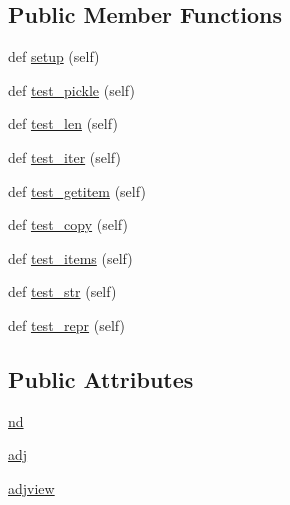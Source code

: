 \subsection*{Public Member Functions}
\begin{DoxyCompactItemize}
\item 
def \hyperlink{classnetworkx_1_1classes_1_1tests_1_1test__coreviews_1_1TestAdjacencyView_ae29722ea74e1008230f548b5bf24a44d}{setup} (self)
\item 
def \hyperlink{classnetworkx_1_1classes_1_1tests_1_1test__coreviews_1_1TestAdjacencyView_acab6e91d2293e722e977cbc924e458e5}{test\+\_\+pickle} (self)
\item 
def \hyperlink{classnetworkx_1_1classes_1_1tests_1_1test__coreviews_1_1TestAdjacencyView_aafd565b4633c66e4b2fdf0b8571331f4}{test\+\_\+len} (self)
\item 
def \hyperlink{classnetworkx_1_1classes_1_1tests_1_1test__coreviews_1_1TestAdjacencyView_ac63721f7414e8827a32aa8a0fc998ede}{test\+\_\+iter} (self)
\item 
def \hyperlink{classnetworkx_1_1classes_1_1tests_1_1test__coreviews_1_1TestAdjacencyView_a8bc801e9aa5de9006c0c087b6c1a2737}{test\+\_\+getitem} (self)
\item 
def \hyperlink{classnetworkx_1_1classes_1_1tests_1_1test__coreviews_1_1TestAdjacencyView_a94d86c7498b436c00389946b1b67132a}{test\+\_\+copy} (self)
\item 
def \hyperlink{classnetworkx_1_1classes_1_1tests_1_1test__coreviews_1_1TestAdjacencyView_a33a0c28ef69d9b523540c3df62816241}{test\+\_\+items} (self)
\item 
def \hyperlink{classnetworkx_1_1classes_1_1tests_1_1test__coreviews_1_1TestAdjacencyView_ad33a36d5d5c078b409fee1c4623e0f1e}{test\+\_\+str} (self)
\item 
def \hyperlink{classnetworkx_1_1classes_1_1tests_1_1test__coreviews_1_1TestAdjacencyView_a5ff95e531d2fe67ad6ebf51168f38850}{test\+\_\+repr} (self)
\end{DoxyCompactItemize}
\subsection*{Public Attributes}
\begin{DoxyCompactItemize}
\item 
\hyperlink{classnetworkx_1_1classes_1_1tests_1_1test__coreviews_1_1TestAdjacencyView_a00f286bd8d2351f992cd82c49a0eb948}{nd}
\item 
\hyperlink{classnetworkx_1_1classes_1_1tests_1_1test__coreviews_1_1TestAdjacencyView_a824abbce8753974355fea146749c5a55}{adj}
\item 
\hyperlink{classnetworkx_1_1classes_1_1tests_1_1test__coreviews_1_1TestAdjacencyView_a3cc4e27577b6f42bf700040019f80049}{adjview}
\end{DoxyCompactItemize}


